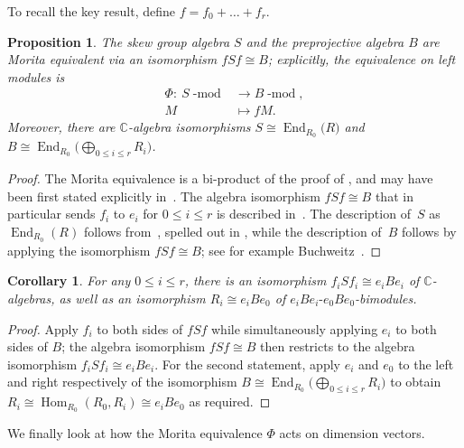 \documentclass[10pt,a4paper]{amsart}
\newtheorem{Corollary}[Theorem]{Corollary}
\newtheorem{Proposition}[Theorem]{Proposition}
 { \theoremstyle{definition}
\newtheorem{Definition}[Theorem]{Definition}
\newtheorem{Example}[Theorem]{Example}
\newtheorem{Remark}[Theorem]{Remark}
\newtheorem{remarks}[theorem]{Remarks}
}
\newcommand{\SC}{\mathbb{C}} %
\newcommand{\End}{\operatorname{End}}
\newcommand{\Hom}{\operatorname{Hom}}
\DeclareMathOperator{\module}{\mathrm{-mod}}
\numberwithin{equation}{section}
\begin{document}
To recall the key result, define $f=f_0+\dots+f_r$.

\begin{Proposition}\label{prop_morita}
The skew group algebra $S$ and the preprojective algebra $B$ are Morita equivalent via an isomorphism $f S f\cong B$; explicitly, the equivalence on left modules is
\begin{align*}\Phi\colon \ S\module & \longrightarrow B\module, \\
M & \mapsto fM.
\end{align*}
Moreover, there are $\mathbb{C}$-algebra isomorphisms
$S\cong \End_{R_0}\big(R)$ and $B\cong \End_{R_0}\big({\bigoplus}_{0\leq i\leq r} R_i\big)$.
\end{Proposition}

\begin{proof} The Morita equivalence is a bi-product of the proof of \cite[Proposition~2.13]{reiten1989two}, and may have been first stated explicitly in~\cite[Theorem~0.1]{crawley1998noncommutative}. The algebra isomorphism $f S f\cong B$ that in particular sends $f_i$ to $e_i$ for $0\leq i\leq r$ is described in~\cite[Theorem~3.4]{crawley1998noncommutative}. The description of~$S$ as $\End_{R_0}(R)$ follows from~\cite{Auslander62}, spelled out in
\cite[Theorem~5.12]{LeuschkeWiegand12}, while the description of~$B$ follows by applying the isomorphism $fSf\cong B$; see for example Buchweitz~\cite{Buchweitz}.
\end{proof}

\begin{Corollary}
\label{cor:moritaRiBi}
 For any $0\leq i\leq r$, there is an isomorphism $f_i S f_i\cong e_iBe_i$ of $\SC$-algebras, as well as an isomorphism $R_i \cong e_iBe_0$ of $e_iBe_i\text{-}e_0Be_0$-bimodules.
\end{Corollary}
\begin{proof}
Apply $f_i$ to both sides of $fSf$ while simultaneously applying $e_i$ to both sides of $B$; the algebra isomorphism $fSf\cong B$ then restricts to the algebra isomorphism $f_i S f_i\cong e_iBe_i$. For the second statement, apply $e_i$ and $e_0$ to the left and right respectively of the isomorphism $B\cong \End_{R_0}\big({\bigoplus}_{0\leq i\leq r} R_i\big)$ to obtain $R_i\cong \Hom_{R_0}(R_0,R_i)\cong e_i B e_0$ as required.
\end{proof}

We finally look at how the Morita equivalence $\Phi$ acts on dimension vectors.
\end{document}
